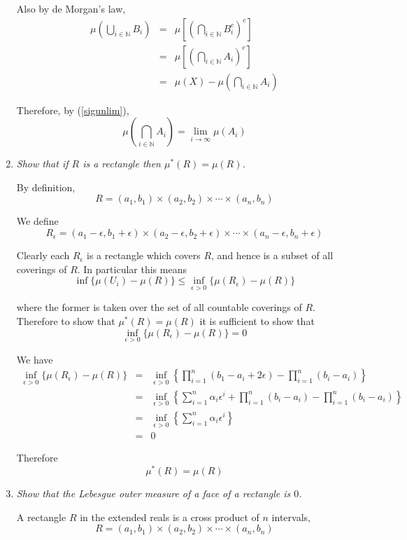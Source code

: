 \documentclass[11pt]{article}
\begin{document}
\begin{enumerate}
Also by de Morgan's law,
\begin{eqnarray*}
\mu\left(\bigcup_{i \in \mathbb{N}} B_i\right) &=& \mu\left[\left(\bigcap_{i \in \mathbb{N}} B_i^c\right)^c\right] \\
&=& \mu\left[\left(\bigcap_{i \in \mathbb{N}} A_i\right)^c\right] \\
&=& \mu(X) - \mu\left(\bigcap_{i \in \mathbb{N}} A_i\right)
\end{eqnarray*}

Therefore, by (\ref{sigunlim}),
\[
\mu\left(\bigcap_{i\in\mathbb{N}} A_i\right) = \lim_{i \rightarrow \infty} \mu\left(A_i\right)
\]

\item \emph{Show that if $R$ is a rectangle then $\mu^\ast(R) = \mu(R)$.}

By definition,
\[
R =  (a_1,b_1) \times (a_2, b_2) \times \cdots \times (a_n, b_n)
\]

We define
\[
R_\epsilon = (a_1-\epsilon,b_1+\epsilon) \times (a_2-\epsilon, b_2+\epsilon) \times \cdots \times (a_n-\epsilon, b_n+\epsilon)
\]

Clearly each $R_\epsilon$ is a rectangle which covers $R$, and hence is a subset of all coverings of $R$.  In particular this means
\[
\inf\{\mu(U_i) - \mu(R)\} \leq \inf_{\epsilon>0} \{\mu(R_\epsilon) - \mu(R)\}
\]

where the former is taken over the set of all countable coverings of $R$.  Therefore to show that $\mu^\ast(R) = \mu(R)$ it is sufficient to show that
\[
\inf_{\epsilon>0} \{\mu(R_\epsilon) - \mu(R)\} = 0
\]

We have
\begin{eqnarray*}
\inf_{\epsilon>0} \{ \mu(R_\epsilon) - \mu(R)\} &=& \inf_{\epsilon > 0} \left\{\prod_{i=1}^n(b_1 - a_i + 2\epsilon) - \prod_{i=1}^n(b_i - a_i)\right\} \\
&=& \inf_{\epsilon > 0}\left\{\sum_{i=1}^n\alpha_i\epsilon^i + \prod_{i=1}^n(b_i - a_i) - \prod_{i=1}^n(b_i - a_i)\right\} \\
&=& \inf_{\epsilon > 0}\left\{\sum_{i=1}^n\alpha_i\epsilon^i\right\} \\
&=& 0
\end{eqnarray*}

Therefore
\[
\mu^\ast(R) = \mu(R)
\]
\item \emph{Show that the Lebesgue outer measure of a face of a rectangle is $0$.}

A rectangle $R$ in the extended reals is a cross product of $n$ intervals,
\[
R = (a_1,b_1) \times (a_2, b_2) \times \cdots \times (a_n, b_n)
\]


\end{enumerate}
\end{document}
